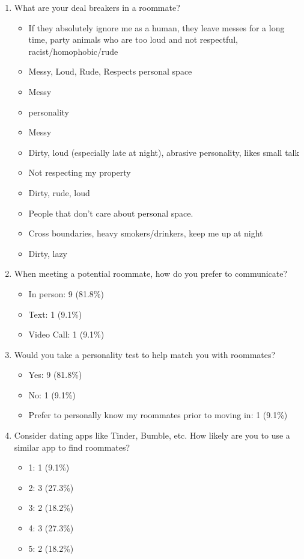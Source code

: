 \documentclass{article}
\begin{document}
\begin{appendices}
\begin{enumerate}
    \medskip
    \item{What are your deal breakers in a roommate?}
        \begin{itemize}
            \item If they absolutely ignore me as a human, they leave messes for a long time, party 
            animals who are too loud and not respectful, racist/homophobic/rude
            \item Messy, Loud, Rude, Respects personal space
            \item Messy
            \item personality 
            \item Messy 
            \item Dirty, loud (especially late at night), abrasive personality, likes small talk
            \item Not respecting my property
            \item Dirty, rude, loud
            \item People that don't care about personal space. 
            \item Cross boundaries, heavy smokers/drinkers, keep me up at night
            \item Dirty, lazy
        \end{itemize}
    
    \newpage
    \item{When meeting a potential roommate, how do you prefer to communicate?}
    \begin{itemize}
        \item In person: 9 (81.8\%)
        \item Text: 1 (9.1\%)
        \item Video Call: 1 (9.1\%)
    \end{itemize}
    
    \medskip
    \item{Would you take a personality test to help match you with roommates?}
    \begin{itemize}
        \item Yes: 9 (81.8\%)
        \item No: 1 (9.1\%)
        \item Prefer to personally know my roommates prior to moving in: 1 (9.1\%)
    \end{itemize}
    
    \medskip
    \item{Consider dating apps like Tinder, Bumble, etc. How likely are you to use a similar app to 
    find roommates?}
    \begin{itemize}
        \item 1: 1 (9.1\%)
        \item 2: 3 (27.3\%)
        \item 3: 2 (18.2\%)
        \item 4: 3 (27.3\%)
        \item 5: 2 (18.2\%)
    \end{itemize}
    

\end{enumerate}
\end{appendices}
\end{document}
